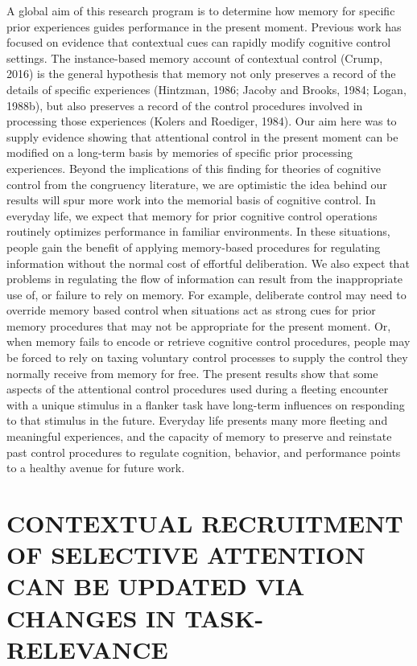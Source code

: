 \documentclass[]{DissertateCUNY}
\begin{document}
A global aim of this research program is to determine how memory for
specific prior experiences guides performance in the present moment.
Previous work has focused on evidence that contextual cues can rapidly
modify cognitive control settings. The instance-based memory account of
contextual control (Crump, 2016) is the general hypothesis that memory
not only preserves a record of the details of specific experiences
(Hintzman, 1986; Jacoby and Brooks, 1984; Logan, 1988b), but also
preserves a record of the control procedures involved in processing
those experiences (Kolers and Roediger, 1984). Our aim here was to
supply evidence showing that attentional control in the present moment
can be modified on a long-term basis by memories of specific prior
processing experiences. Beyond the implications of this finding for
theories of cognitive control from the congruency literature, we are
optimistic the idea behind our results will spur more work into the
memorial basis of cognitive control. In everyday life, we expect that
memory for prior cognitive control operations routinely optimizes
performance in familiar environments. In these situations, people gain
the benefit of applying memory-based procedures for regulating
information without the normal cost of effortful deliberation. We also
expect that problems in regulating the flow of information can result
from the inappropriate use of, or failure to rely on memory. For
example, deliberate control may need to override memory based control
when situations act as strong cues for prior memory procedures that may
not be appropriate for the present moment. Or, when memory fails to
encode or retrieve cognitive control procedures, people may be forced to
rely on taxing voluntary control processes to supply the control they
normally receive from memory for free. The present results show that
some aspects of the attentional control procedures used during a
fleeting encounter with a unique stimulus in a flanker task have
long-term influences on responding to that stimulus in the future.
Everyday life presents many more fleeting and meaningful experiences,
and the capacity of memory to preserve and reinstate past control
procedures to regulate cognition, behavior, and performance points to a
healthy avenue for future work.

\FloatBarrier
\newpage
{}
\fancyhead[R]{\thepage}
\fancyfoot[C]{}

\chapter{CONTEXTUAL RECRUITMENT OF SELECTIVE ATTENTION CAN BE UPDATED VIA CHANGES IN TASK-RELEVANCE}
\end{document}

